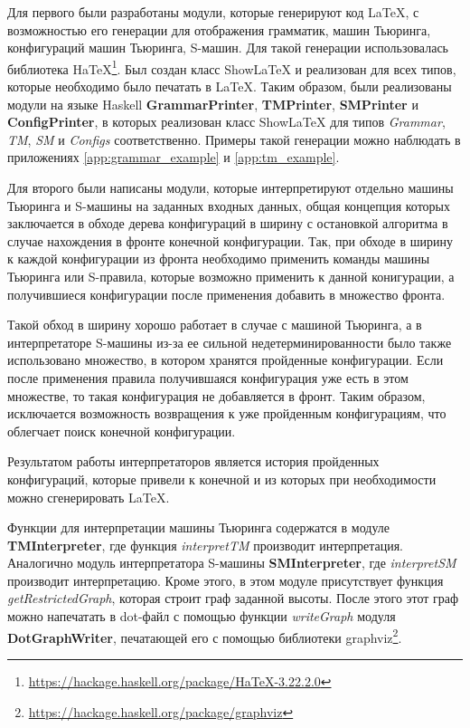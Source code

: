 \documentclass[14pt]{matmex-diploma-custom}
\begin{document}
Для первого были разработаны модули, которые генерируют код LaTeX, с возможностью его генерации для отображения грамматик, машин Тьюринга, конфигураций машин Тьюринга, S-машин. 
Для такой генерации использовалась библиотека HaTeX\footnote{\url{https://hackage.haskell.org/package/HaTeX-3.22.2.0}}. Был создан класс ShowLaTeX и реализован для всех типов, которые необходимо было печатать в LaTeX. 
Таким образом, были реализованы модули на языке Haskell \textbf{GrammarPrinter}, \textbf{TMPrinter}, \textbf{SMPrinter} и \textbf{ConfigPrinter}, в которых реализован класс ShowLaTeX для типов \textit{Grammar}, \textit{TM}, \textit{SM} и \textit{Configs} соответственно. Примеры такой генерации можно наблюдать в приложениях \ref{app:grammar_example} и \ref{app:tm_example}.

Для второго были написаны модули, которые интерпретируют отдельно машины Тьюринга и S-машины на заданных входных данных, общая концепция которых заключается в обходе дерева конфигураций в ширину с остановкой алгоритма в случае нахождения в фронте конечной конфигурации. Так, при обходе в ширину к каждой конфигурации из фронта необходимо применить команды машины Тьюринга или S-правила, которые возможно применить к данной конигурации, а получившиеся конфигурации после применения добавить в множество фронта. 

Такой обход в ширину хорошо работает в случае с машиной Тьюринга, а в интерпретаторе S-машины из-за ее сильной недетерминированности было также использовано множество, в котором хранятся пройденные конфигурации. Если после применения правила получившаяся конфигурация уже есть в этом множестве, то такая конфигурация не добавляется в фронт. Таким образом, исключается возможность возвращения к уже пройденным конфигурациям, что облегчает поиск конечной конфигурации.  

Результатом работы интерпретаторов является история пройденных конфигураций, которые привели к конечной и из которых при необходимости можно сгенерировать LaTeX. 

Функции для интерпретации машины Тьюринга содержатся в модуле \textbf{TMInterpreter}, где функция \textit{interpretTM} производит интерпретация. Аналогично модуль интерпретатора S-машины \textbf{SMInterpreter}, где \textit{interpretSM} производит интерпретацию. 
Кроме этого, в этом модуле присутствует функция \textit{getRestrictedGraph}, которая строит граф заданной высоты. После этого этот граф можно напечатать в dot-файл с помощью функции \textit{writeGraph} модуля \textbf{DotGraphWriter}, печатающей его с помощью библиотеки graphviz\footnote{\url{https://hackage.haskell.org/package/graphviz}}. 
\end{document}
